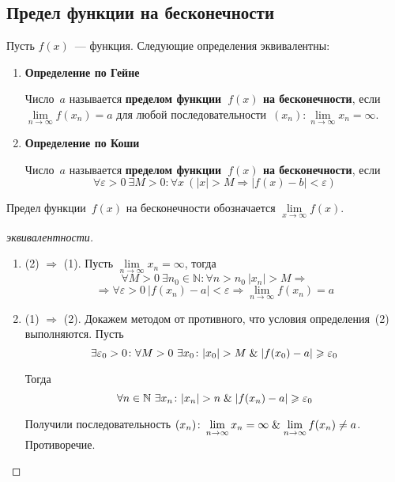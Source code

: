 \subsection{Предел функции на бесконечности}
Пусть $f(x)$~--- функция.
Следующие определения эквивалентны:
\begin{enumerate}
	\item \textbf{Определение по Гейне}
	
	Число~$a$ называется \textbf{пределом функции~$f(x)$ на бесконечности}, если $\lim\limits_{n \to \infty} f(x_n) = a$ для любой последовательности~$(x_n) \colon \lim\limits_{n \to \infty} x_n = \infty$.
	
	\item \textbf{Определение по Коши}
	
	Число~$a$ называется \textbf{пределом функции~$f(x)$ на бесконечности}, если
	\begin{equation*}
	\forall \varepsilon > 0 \ \exists M > 0 \colon \forall x \ (|x| > M \Rightarrow |f(x) - b| < \varepsilon)
	\end{equation*}
\end{enumerate}

Предел функции~$f(x)$ на бесконечности обозначается $\lim\limits_{x \to \infty} f(x)$.
\begin{proof}[эквивалентности]
\begin{enumerate}
	\item (2) $\Rightarrow$ (1).
	Пусть $\lim\limits_{n \to \infty} x_n = \infty$, тогда
	\begin{equation*}
	\forall M > 0 \ \exists n_0 \in \mathbb N \colon \forall n > n_0 \ |x_n| > M \Rightarrow
	\end{equation*}
	\begin{equation*}
	\Rightarrow \forall \varepsilon > 0 \ |f(x_n) - a| < \varepsilon \Rightarrow
	\lim_{n \to \infty} f(x_n) = a
	\end{equation*}
	
	\item (1) $\Rightarrow$ (2).
	Докажем методом от противного, что условия определения~(2) выполняются.
	Пусть
	\begin{equation*}
	\exists \varepsilon_0 > 0 \colon \forall M > 0 \ \exists x_0 \colon |x_0| > M \mathrel{\&} |f(x_0) - a| \geqslant \varepsilon_0
	\end{equation*}
	
	Тогда
	\begin{equation*}
	\forall n \in \mathbb N \ \exists x_n \colon |x_n| > n \mathrel{\&} |f(x_n) - a| \geqslant \varepsilon_0
	\end{equation*}
	
	Получили последовательность $(x_n) \colon \lim\limits_{n \to \infty} x_n = \infty \mathrel{\&} \lim\limits_{n \to \infty} f(x_n) \neq a$.
	Противоречие.
\end{enumerate}
\end{proof}

